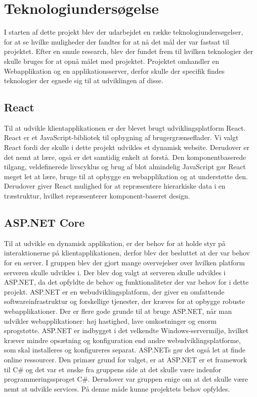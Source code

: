 \chapter{Teknologiundersøgelse}

I starten af dette projekt blev der udarbejdet en række teknologiundersøgelser, for at se hvilke muligheder der fandtes for at nå det mål der var fastsat til projektet. Efter en smule research, blev der fundet frem til hvilken teknologier der skulle bruges for at opnå målet med projektet. Projektet omhandler en Webapplikation og en applikationsserver, derfor skulle der specifik findes teknologier der egnede sig til at udviklingen af disse.    

\section{React}

Til at udvikle klientapplikationen er der blevet brugt udviklingsplatform React. React er et JavaScript-bibliotek til opbygning af brugergrænseflader. Vi valgt React fordi der skulle i dette projekt udvikles et dynamisk website. Derudover er det nemt at lære, også er det samtidig enkelt at forstå. Den komponentbaserede tilgang, veldefinerede livscyklus og brug af blot almindelig JavaScript gør React meget let at lære, bruge til at opbygge en webapplikation og at understøtte den. Derudover giver React mulighed for at repræsentere hierarkiske data i en træstruktur, hvilket repræsenterer komponent-baseret design.

\section{ASP.NET Core}

Til at udvikle en dynamisk applikation, er der behov for at holde styr på interaktionerne på klientapplikationen, derfor blev der besluttet at der var behov for en server. I gruppen blev der gjort mange overvejelser over hvilken platform serveren skulle udvikles i. Der blev dog valgt at serveren skulle udvikles i ASP.NET, da det opfyldte de behov og funktionaliteter der var behov for i dette projekt. ASP.NET er en webudviklingsplatform, der giver en omfattende softwareinfrastruktur og forskellige tjenester, der kræves for at opbygge robuste webapplikationer. Der er flere gode grunde til at bruge ASP.NET, når man udvikler webapplikationer: høj hastighed, lave omkostninger og enorm sprogstøtte. ASP.NET er indbygget i det velkendte Windows-servermiljø, hvilket kræver mindre opsætning og konfiguration end andre webudviklingsplatforme, som skal installeres og konfigureres separat. ASP.NETs gør det også let at finde online ressourcer. Den primær grund for valget, er at ASP.NET er et framework til C\# og det var et ønske fra gruppens side at det skulle være indenfor programmeringssproget C\#. Derudover var gruppen enige om at det skulle være nemt at udvikle services. På denne måde kunne projektets behov opfyldes.


